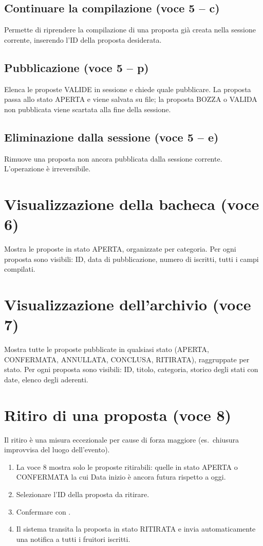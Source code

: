 \documentclass[12pt,a4paper,oneside]{report}
\newcommand{\tasto}[1]{\fbox{\small\ttfamily#1}}
\begin{document}
\subsection{Continuare la compilazione (voce 5 -- c)}
Permette di riprendere la compilazione di una proposta già creata nella sessione corrente, inserendo l'ID della proposta desiderata.

\subsection{Pubblicazione (voce 5 -- p)}
Elenca le proposte VALIDE in sessione e chiede quale pubblicare. La proposta passa allo stato APERTA e viene salvata su file; la proposta BOZZA o VALIDA non pubblicata viene scartata alla fine della sessione.

\subsection{Eliminazione dalla sessione (voce 5 -- e)}
Rimuove una proposta non ancora pubblicata dalla sessione corrente. L'operazione è irreversibile.

\section{Visualizzazione della bacheca (voce 6)}
Mostra le proposte in stato APERTA, organizzate per categoria. Per ogni proposta sono visibili: ID, data di pubblicazione, numero di iscritti, tutti i campi compilati.

\section{Visualizzazione dell'archivio (voce 7)}
Mostra tutte le proposte pubblicate in qualsiasi stato (APERTA, CONFERMATA, ANNULLATA, CONCLUSA, RITIRATA), raggruppate per stato. Per ogni proposta sono visibili: ID, titolo, categoria, storico degli stati con date, elenco degli aderenti.

\section{Ritiro di una proposta (voce 8)}
\label{sec:ritiro}

Il ritiro è una misura eccezionale per cause di forza maggiore (es.\ chiusura improvvisa del luogo dell'evento).

\begin{enumerate}
  \item La voce 8 mostra solo le proposte ritirabili: quelle in stato APERTA o CONFERMATA la cui Data inizio è ancora futura rispetto a oggi.
  \item Selezionare l'ID della proposta da ritirare.
  \item Confermare con \tasto{s}.
  \item Il sistema transita la proposta in stato RITIRATA e invia automaticamente una notifica a tutti i fruitori iscritti.
\end{enumerate}
\end{document}
